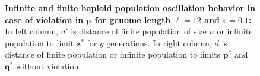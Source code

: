 \begin{figure}[h]
\begin{center}
\hspace{-3em}%
\vspace{-0.5em} \hspace{-3em}%


\caption[\textbf{Infinite and finite haploid population oscillation behavior in case of violation in $\bm{\mu}$ for genome length $\ell = 12$ and $\bm{\epsilon} = 0.1$}]{\textbf{Infinite and finite haploid population oscillation behavior in case of violation in $\bm{\mu}$ for genome length $\ell = 12$ and $\bm{\epsilon} = 0.1$:} 
  In left column, $d'$ is distance of finite population of size $n$ or infinite population to limit $\bm{z}^\ast$ for $g$ generations. In right column, $d$ is distance of finite population or infinite population to limits $\bm{p}^\ast$ and $\bm{q}^\ast$ without violation.}
\label{oscillation_12h_vio_mu_0.1}
\end{center}
\end{figure}

